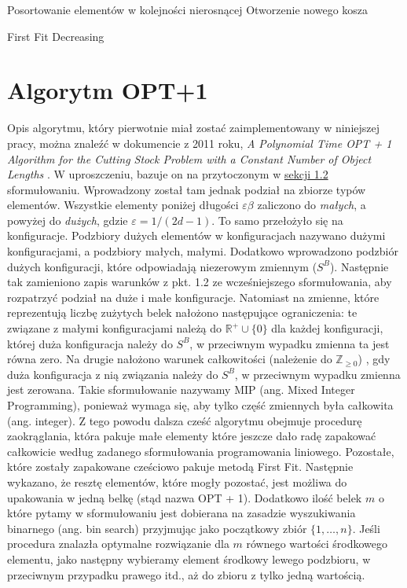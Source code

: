 \begin{pseudokod}[H]
	Posortowanie elementów w kolejności nierosnącej \;
	Otworzenie nowego kosza \;
	
	\caption{First Fit Decreasing}
\end{pseudokod}

\section{Algorytm OPT+1}
Opis algorytmu, który pierwotnie miał zostać zaimplementowany w niniejszej pracy, można znaleźć w dokumencie z 2011 roku, \textit{A Polynomial Time OPT + 1 Algorithm for the Cutting Stock Problem with a Constant Number of Object Lengths} \cite{ALG_OPT_1}. 
W uproszczeniu, bazuje on na przytoczonym w 
\hyperlink{section.1.2}{sekcji 1.2} sformułowaniu.
Wprowadzony został tam jednak podział na zbiorze typów elementów. 
Wszystkie elementy poniżej długości $\varepsilon\beta$ zaliczono do \textit{małych}, a powyżej do \textit{dużych}, gdzie $\varepsilon = 1/(2d-1)$. To samo przełożyło się na konfiguracje. Podzbiory dużych elementów w konfiguracjach nazywano dużymi konfiguracjami, a podzbiory małych, małymi. Dodatkowo wprowadzono podzbiór dużych konfiguracji, które odpowiadają niezerowym zmiennym ($S^B$). Następnie tak zamieniono zapis warunków z pkt. 1.2 ze wcześniejszego sformułowania, aby rozpatrzyć podział na duże i małe konfiguracje. Natomiast na zmienne, które reprezentują liczbę zużytych belek nałożono następujące ograniczenia: te związane z małymi konfiguracjami należą do $\mathbb{R}^+\cup \{0\}$ dla każdej konfiguracji, której duża konfiguracja należy do $S^B$, w przeciwnym wypadku zmienna ta jest równa zero. Na drugie nałożono warunek całkowitości (należenie do $\mathbb{Z}_{\geq 0}$) , gdy duża konfiguracja z nią związania należy do $S^B$, w przeciwnym wypadku zmienna jest zerowana.
Takie sformułowanie nazywamy MIP (ang. Mixed Integer Programming), ponieważ wymaga się, aby tylko część zmiennych była całkowita (ang. integer).
Z tego powodu dalsza cześć algorytmu obejmuje procedurę zaokrąglania, która pakuje małe elementy które jeszcze dało radę zapakować całkowicie według zadanego sformułowania programowania liniowego. Pozostałe, które zostały zapakowane cześciowo pakuje metodą First Fit. Następnie wykazano, że resztę elementów, które mogły pozostać, jest możliwa do upakowania w jedną belkę (stąd nazwa OPT + 1). Dodatkowo ilość belek $m$ o które pytamy w sformułowaniu jest dobierana na zasadzie wyszukiwania binarnego (ang. bin search) przyjmując jako początkowy zbiór $\{1,\dots, n\}$. Jeśli procedura znalazła optymalne rozwiązanie dla $m$ równego wartości środkowego elementu, jako następny wybieramy element środkowy lewego podzbioru, w przeciwnym przypadku prawego itd., aż do zbioru z tylko jedną wartością. \\
